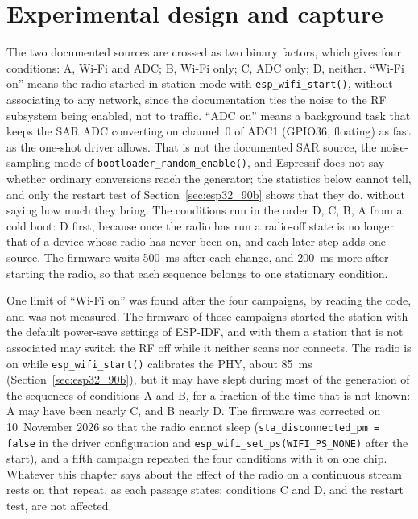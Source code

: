 \section{Experimental design and capture}
\label{sec:esp32_setup}

The two documented sources are crossed as two binary factors, which gives
four conditions: A, Wi-Fi and ADC; B, Wi-Fi only; C, ADC only; D,
neither. ``Wi-Fi on'' means the radio started in station mode with
\texttt{esp\_wifi\_start()}, without associating to any network, since
the documentation ties the noise to the RF subsystem being enabled, not
to traffic. ``ADC on'' means a background task that keeps the SAR ADC
converting on channel~0 of ADC1 (GPIO36, floating) as fast as the
one-shot driver allows. That is not the documented SAR source, the
noise-sampling mode of \texttt{bootloader\_random\_enable()}, and
Espressif does not say whether ordinary conversions reach the generator;
the statistics below cannot tell, and only the restart test of
Section~\ref{sec:esp32_90b} shows that they do, without saying how much
they bring. The conditions run
in the order D, C, B, A from a cold boot: D first, because once the radio
has run a radio-off state is no longer that of a device whose radio has
never been on, and each later step adds one source. The firmware waits
500~ms after each change, and 200~ms more after starting the radio, so
that each sequence belongs to one stationary condition.

One limit of ``Wi-Fi on'' was found after the four campaigns, by reading
the code, and was not measured. The firmware of those campaigns started
the station with the default power-save settings of ESP-IDF, and with
them a station that is not associated may switch the RF off while it
neither scans nor connects. The radio is on while
\texttt{esp\_wifi\_start()} calibrates the PHY, about 85~ms
(Section~\ref{sec:esp32_90b}), but it may have slept during most of the
generation of the sequences of conditions A and B, for a fraction of the
time that is not known: A may have been nearly C, and B nearly D. The
firmware was corrected on 10~November 2026 so that the radio cannot
sleep (\texttt{sta\_disconnected\_pm = false} in the driver configuration
and \texttt{esp\_wifi\_set\_ps(WIFI\_PS\_NONE)} after the start), and a
fifth campaign repeated the four conditions with it on one chip. Whatever
this chapter says about the effect of the radio on a continuous stream
rests on that repeat, as each passage states; conditions C and D, and
the restart test, are not affected.

